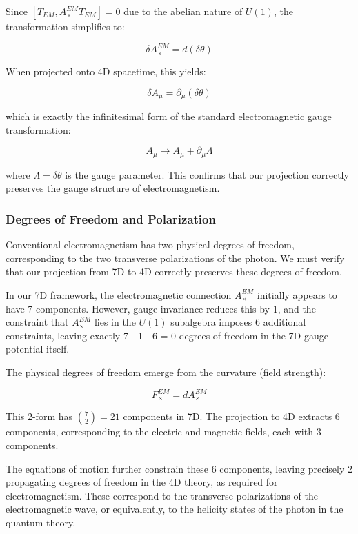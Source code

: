 \documentclass{article}
\begin{document}
Since $[T_{EM}, A^{EM}_{\times} T_{EM}] = 0$ due to the abelian nature of $U(1)$, the transformation simplifies to:

\begin{equation}
\delta A^{EM}_{\times} = d(\delta\theta)
\end{equation}

When projected onto 4D spacetime, this yields:

\begin{equation}
\delta A_{\mu} = \partial_{\mu}(\delta\theta)
\end{equation}

which is exactly the infinitesimal form of the standard electromagnetic gauge transformation:

\begin{equation}
A_{\mu} \rightarrow A_{\mu} + \partial_{\mu}\Lambda
\end{equation}

where $\Lambda = \delta\theta$ is the gauge parameter. This confirms that our projection correctly preserves the gauge structure of electromagnetism.

\subsubsection{Degrees of Freedom and Polarization}

Conventional electromagnetism has two physical degrees of freedom, corresponding to the two transverse polarizations of the photon. We must verify that our projection from 7D to 4D correctly preserves these degrees of freedom.

In our 7D framework, the electromagnetic connection $A^{EM}_{\times}$ initially appears to have 7 components. However, gauge invariance reduces this by 1, and the constraint that $A^{EM}_{\times}$ lies in the $U(1)$ subalgebra imposes 6 additional constraints, leaving exactly 7 - 1 - 6 = 0 degrees of freedom in the 7D gauge potential itself.

The physical degrees of freedom emerge from the curvature (field strength):

\begin{equation}
F^{EM}_{\times} = dA^{EM}_{\times}
\end{equation}

This 2-form has $\binom{7}{2} = 21$ components in 7D. The projection to 4D extracts 6 components, corresponding to the electric and magnetic fields, each with 3 components.

The equations of motion further constrain these 6 components, leaving precisely 2 propagating degrees of freedom in the 4D theory, as required for electromagnetism. These correspond to the transverse polarizations of the electromagnetic wave, or equivalently, to the helicity states of the photon in the quantum theory.
\end{document}
